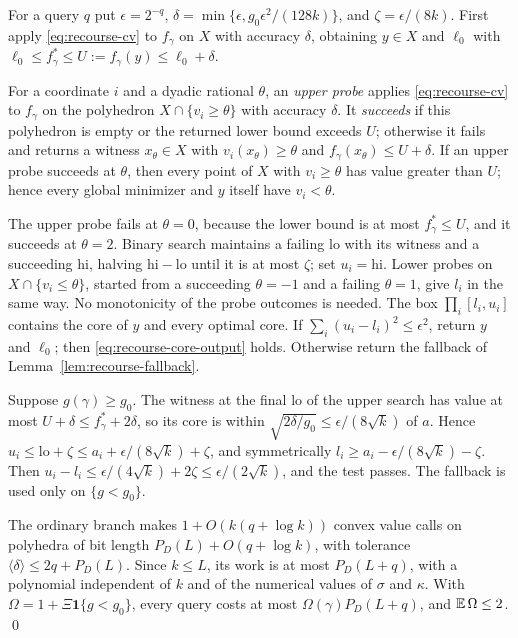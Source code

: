 For a query $q$ put $\epsilon=2^{-q}$,
$\delta=\min\{\epsilon,g_0\epsilon^2/(128k)\}$, and
$\zeta=\epsilon/(8k)$. First apply \eqref{eq:recourse-cv} to $f_\gamma$
on $X$ with accuracy $\delta$, obtaining $y\in X$ and $\ell_0$ with
$\ell_0\le f_\gamma^*\le U:=f_\gamma(y)\le\ell_0+\delta$.

For a coordinate $i$ and a dyadic rational $\theta$, an \emph{upper
probe} applies \eqref{eq:recourse-cv} to $f_\gamma$ on the polyhedron
$X\cap\{v_i\ge\theta\}$ with accuracy $\delta$. It \emph{succeeds} if
this polyhedron is empty or the returned lower bound exceeds $U$;
otherwise it fails and returns a witness $x_\theta\in X$ with
$v_i(x_\theta)\ge\theta$ and $f_\gamma(x_\theta)\le U+\delta$. If an
upper probe succeeds at $\theta$, then every point of $X$ with
$v_i\ge\theta$ has value greater than $U$; hence every global minimizer
and $y$ itself have $v_i<\theta$.

The upper probe fails at $\theta=0$, because the lower bound is at most
$f_\gamma^*\le U$, and it succeeds at $\theta=2$. Binary search
maintains a failing $\mathrm{lo}$ with its witness and a succeeding
$\mathrm{hi}$, halving $\mathrm{hi}-\mathrm{lo}$ until it is at most
$\zeta$; set $u_i=\mathrm{hi}$. Lower probes on
$X\cap\{v_i\le\theta\}$, started from a succeeding $\theta=-1$ and a
failing $\theta=1$, give $l_i$ in the same way. No monotonicity of the
probe outcomes is needed. The box $\prod_i[l_i,u_i]$ contains the core
of $y$ and every optimal core. If $\sum_i(u_i-l_i)^2\le\epsilon^2$,
return $y$ and $\ell_0$; then \eqref{eq:recourse-core-output} holds.
Otherwise return the fallback of Lemma~\ref{lem:recourse-fallback}.

Suppose $g(\gamma)\ge g_0$. The witness at the final $\mathrm{lo}$ of
the upper search has value at most $U+\delta\le f_\gamma^*+2\delta$, so
its core is within $\sqrt{2\delta/g_0}\le\epsilon/(8\sqrt k)$ of $a$.
Hence $u_i\le\mathrm{lo}+\zeta\le a_i+\epsilon/(8\sqrt k)+\zeta$, and
symmetrically $l_i\ge a_i-\epsilon/(8\sqrt k)-\zeta$. Then
$u_i-l_i\le\epsilon/(4\sqrt k)+2\zeta\le\epsilon/(2\sqrt k)$, and the
test passes. The fallback is used only on $\{g<g_0\}$.

The ordinary branch makes $1+O(k(q+\log k))$ convex value calls on
polyhedra of bit length $P_D(L)+O(q+\log k)$, with tolerance
$\langle\delta\rangle\le2q+P_D(L)$. Since $k\le L$, its work is at most
$P_D(L+q)$, with a polynomial independent of $k$ and of the numerical
values of $\sigma$ and $\kappa$. With $\Omega=1+\Xi\mathbf1\{g<g_0\}$,
every query costs at most $\Omega(\gamma)P_D(L+q)$, and
$\mathbb E\,\Omega\le2$.
\qed

